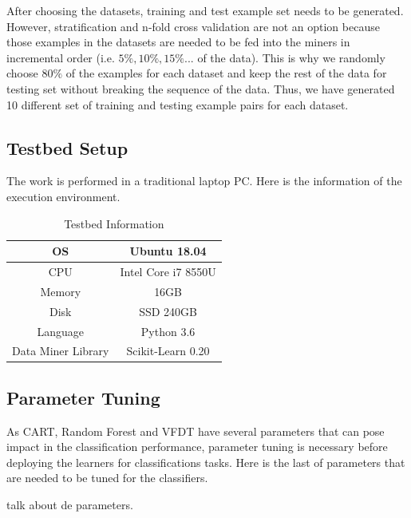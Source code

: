 \documentclass[sigplan]{acmart}\settopmatter{printfolios=true,printccs=false,printacmref=false}
\begin{document}
After choosing the datasets, training and test example set needs to be generated. However, stratification and n-fold cross validation are not an option because those examples in the datasets are needed to be fed into the miners in incremental order (i.e. $5\%, 10\%, 15\%... $ of the data). This is why we randomly choose $80\%$ of the examples for each dataset and keep the rest of the data for testing set without breaking the sequence of the data. Thus, we have generated 10 different set of training and testing example pairs for each dataset. 

\subsection{Testbed Setup}
The work is performed in a traditional laptop PC. Here is the information of the execution environment.

\begin{center}
	\begin{table}[h]
		\begin{tabular}{|c|c|}
			\hline 
			OS & Ubuntu 18.04 \\ 
			\hline 
			CPU & Intel Core i7 8550U \\ 
			\hline 
			Memory & 16GB \\ 
			\hline 
			Disk & SSD 240GB \\ 
			\hline 
			Language & Python 3.6 \\ 
			\hline 
			Data Miner Library & Scikit-Learn 0.20 \\ 
			\hline  
		\end{tabular} 
	\caption{Testbed Information}
	\label{tab:testbed}
	\end{table}
\end{center}

\subsection{Parameter Tuning}
As CART, Random Forest and VFDT have several parameters that can pose impact in the classification performance, parameter tuning is necessary before deploying the learners for classifications tasks. Here is the last of parameters that are needed to be tuned for the classifiers.

talk about de parameters.
\end{document}
